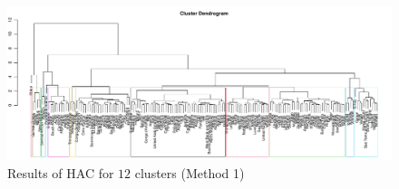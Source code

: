 \documentclass[a4paper,12pt]{article}
\numberwithin{equation}{section}
\begin{document}
\newpage 
\FloatBarrier
\begin{figure}
\includegraphics[width=\textwidth]{plots/14days/dendrogram}
\caption{Results of HAC for $12$ clusters (Method 1)}\label{fig:dend}
\end{figure}
\end{document}

